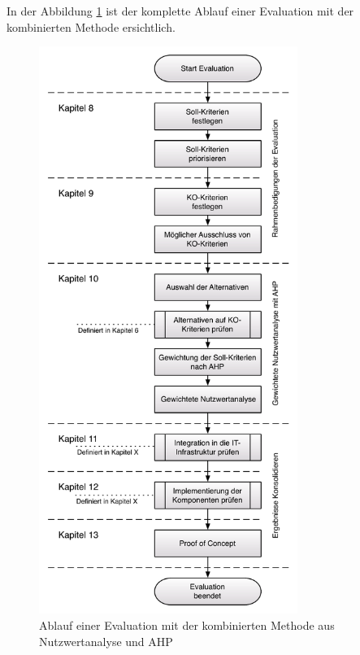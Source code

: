   In der Abbildung \ref{img:ablaufEvaluation} ist der komplette Ablauf einer
  Evaluation mit der kombinierten Methode ersichtlich.
    
  \begin{figure}[ht]
    \begin{center}
      \includegraphics[width=0.75\textwidth]{./image/kompletterAblaufDerEvaluation.pdf}
      \caption{Ablauf einer Evaluation mit der kombinierten Methode aus Nutzwertanalyse und \ac{AHP}}
      \label{img:ablaufEvaluation}
    \end{center}
  \end{figure}
  
